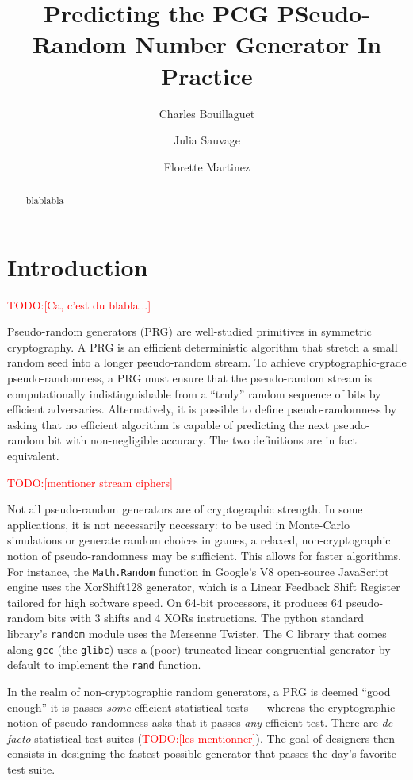 \documentclass[preprint,svgnames]{iacrtrans}
\title{Predicting the PCG PSeudo-Random Number Generator In Practice}
\author{Charles Bouillaguet\inst{1} \and Julia Sauvage\inst{2} \and Florette Martinez\inst{3}}
\institute{%
University of Lille, France \\ 
\email{charles.bouillaguet@univ-lille.fr}
\and 
Sorbonne University \\
\email{julia.sauvage@etu.upmc.fr}
\and 
LIP6, CNRS, SU ? \\
\email{florette.martinez@lip6.fr}

}
\newcommand{\todo}[1]{\textcolor{red}{TODO:[#1]}}
\begin{document}
\maketitle


\begin{abstract}
  blablabla
\end{abstract}

\section{Introduction} %

\todo{Ca, c'est du blabla...}

Pseudo-random generators (PRG) are well-studied primitives in symmetric
cryptography. A PRG is an efficient deterministic algorithm that stretch a small
random seed into a longer pseudo-random stream. To achieve cryptographic-grade
pseudo-randomness, a PRG must ensure that the pseudo-random stream is
computationally indistinguishable from a ``truly'' random sequence of bits by
efficient adversaries. Alternatively, it is possible to define pseudo-randomness
by asking that no efficient algorithm is capable of predicting the next
pseudo-random bit with non-negligible accuracy. The two definitions are in fact
equivalent.

\todo{mentioner stream ciphers}

Not all pseudo-random generators are of cryptographic strength. In some
applications, it is not necessarily necessary: to be used in Monte-Carlo
simulations or generate random choices in games, a relaxed, non-cryptographic
notion of pseudo-randomness may be sufficient. This allows for faster
algorithms. For instance, the \texttt{Math.Random} function in Google's V8
open-source JavaScript engine uses the \textsf{XorShift128} generator, which is
a Linear Feedback Shift Register tailored for high software speed. On 64-bit
processors, it produces 64 pseudo-random bits with 3 shifts and 4 XORs
instructions. The \textsf{python} standard library's \texttt{random} module uses
the Mersenne Twister. The \textsf{C} library that comes along \texttt{gcc} (the
\texttt{glibc}) uses a (poor) truncated linear congruential generator by default
to implement the \texttt{rand} function.

In the realm of non-cryptographic random generators, a PRG is deemed ``good
enough'' it is passes \emph{some} efficient statistical tests --- whereas the
cryptographic notion of pseudo-randomness asks that it passes \emph{any}
efficient test. There are \textit{de facto} statistical test suites (\todo{les
  mentionner}). The goal of designers then consists in designing the fastest
possible generator that passes the day's favorite test suite.
\end{document}
